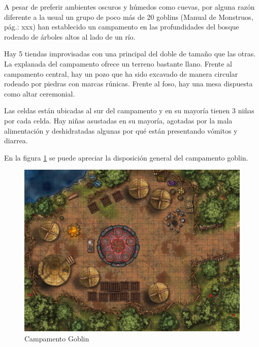 \documentclass[10pt,twoside,twocolumn,openany]{dndbook}
\begin{document}
A pesar de preferir ambientes oscuros y húmedos como cuevas, por alguna razón diferente a la usual 
un grupo de poco más de 20 goblins (Manual de Monstruos, pág.: xxx) han establecido un campamento 
en las profundidades del bosque rodeado de árboles altos al lado de un río. 

Hay 5 tiendas improvisadas con una principal del doble de tamaño que las otras. La explanada del 
campamento ofrece un terreno bastante llano. Frente al campamento central, hay un pozo que ha sido 
excavado de manera circular rodeado por piedras con marcas rúnicas. Frente al foso, hay una mesa 
dispuesta como altar ceremonial.

Las celdas están ubicadas al sur del campamento y en su mayoría tienen 3 niñas por cada celda. Hay 
niñas asustadas en su mayoría, agotadas por la mala alimentación y deshidratadas algunas por qué 
están presentando vómitos y diarrea.

En la figura \ref{fig:camp1} se puede apreciar la disposición general del campamento goblin.

\begin{figure}[hb!]
  \centering
  \includegraphics[width=\textwidth]{maps/goblin-camp.jpg}
  \caption{Campamento Goblin}
  \label{fig:camp1}
\end{figure}
\end{document}
